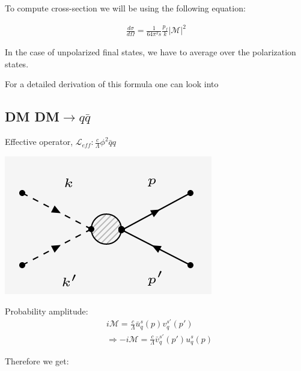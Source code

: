 \documentclass[12pt]{report}
\begin{document}
To compute cross-section we will be using the following equation:

\begin{align}
\frac{d\sigma}{d\Omega}= \frac{1}{64 \pi^2 s} \frac{p_f}{k} |\mathcal{M}|^2 \label{cross}
\end{align}

In the case of unpolarized final states, we have to average over the polarization states.


For a detailed derivation of this formula one can look into \cite{pes}


\subsection{DM DM$\longrightarrow q \bar{q}$}
 Effective operator, $\mathscr{L}_{eff} : \frac{c}{\Lambda} \phi^2 \bar{q}q$
\begin{center}
\includegraphics[scale=0.5]{qqbar.png}
\end{center}


Probability amplitude:
\begin{align*}
& i \mathcal{M}= \frac{c}{\Lambda} \bar{u}^s_q(p)v^{s\prime}_q(p\prime)\\
&\Rightarrow -i \mathcal{M} = \frac{c}{\Lambda} \bar{v}_q^{s\prime}(p\prime) u^s_q(p)
\end{align*}

Therefore we get:
\end{document}
